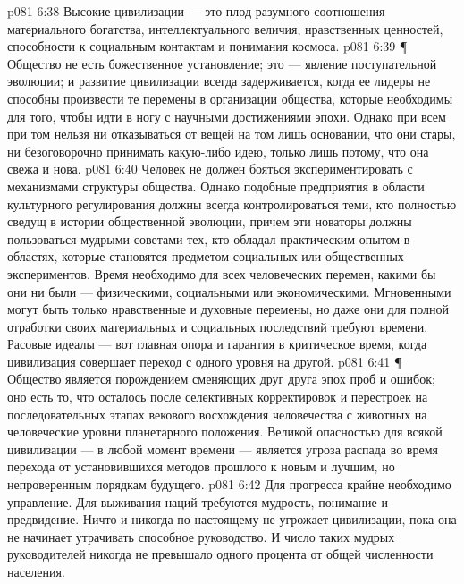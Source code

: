 \vs p081 6:38 Высокие цивилизации --- это плод разумного соотношения материального богатства, интеллектуального величия, нравственных ценностей, способности к социальным контактам и понимания космоса.
\vs p081 6:39 \P\ \bibnobreakspace {} Общество не есть божественное установление; это --- явление поступательной эволюции; и развитие цивилизации всегда задерживается, когда ее лидеры не способны произвести те перемены в организации общества, которые необходимы для того, чтобы идти в ногу с научными достижениями эпохи. Однако при всем при том нельзя ни отказываться от вещей на том лишь основании, что они стары, ни безоговорочно принимать какую\hyp{}либо идею, только лишь потому, что она свежа и нова.
\vs p081 6:40 Человек не должен бояться экспериментировать с механизмами структуры общества. Однако подобные предприятия в области культурного регулирования должны всегда контролироваться теми, кто полностью сведущ в истории общественной эволюции, причем эти новаторы должны пользоваться мудрыми советами тех, кто обладал практическим опытом в областях, которые становятся предметом социальных или общественных экспериментов.  Время необходимо для всех человеческих перемен, какими бы они ни были --- физическими, социальными или экономическими. Мгновенными могут быть только нравственные и духовные перемены, но даже они для полной отработки своих материальных и социальных последствий требуют времени. Расовые идеалы --- вот главная опора и гарантия в критическое время, когда цивилизация совершает переход с одного уровня на другой.
\vs p081 6:41 \P\ \bibnobreakspace {} Общество является порождением сменяющих друг друга эпох проб и ошибок; оно есть то, что осталось после селективных корректировок и перестроек на последовательных этапах векового восхождения человечества с животных на человеческие уровни планетарного положения. Великой опасностью для всякой цивилизации --- в любой момент времени --- является угроза распада во время перехода от установившихся методов прошлого к новым и лучшим, но непроверенным порядкам будущего.
\vs p081 6:42 Для прогресса крайне необходимо управление. Для выживания наций требуются мудрость, понимание и предвидение. Ничто и никогда по\hyp{}настоящему не угрожает цивилизации, пока она не начинает утрачивать способное руководство. И число таких мудрых руководителей никогда не превышало одного процента от общей численности населения.
